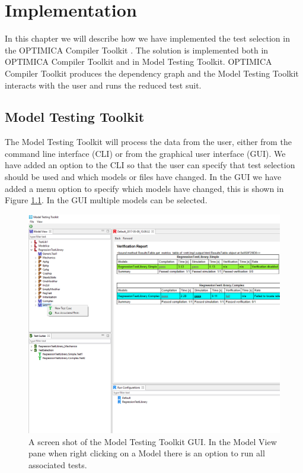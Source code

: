 \documentclass{cslthse-msc}
\begin{document}
\chapter[Implementation]{Implementation}
In this chapter we will describe how we have implemented the test selection in the OPTIMICA Compiler Toolkit . The solution is implemented both in OPTIMICA Compiler Toolkit and in Model Testing Toolkit. OPTIMICA Compiler Toolkit  produces the dependency graph and the Model Testing Toolkit interacts with the user and runs the reduced test suit.

\section{Model Testing Toolkit}

The Model Testing Toolkit will process the data from the user, either from the command line interface (CLI) or from the graphical user interface (GUI). We have added an option to the CLI so that the user can specify that test selection should be used and which models or files have changed. In the GUI we have added a menu option to specify which models have changed, this is shown in Figure \ref{fig:MTTrun}. In the GUI multiple models can be selected.

\begin{figure}[!hbtp]
    \includegraphics[width=1.0\textwidth]{Pictures/MTT_Capture.png}
    \caption{A screen shot of the Model Testing Toolkit GUI. In the Model View pane when right clicking on a Model there is an option to run all associated tests.}
    \label{fig:MTTrun}
\end{figure}
\end{document}

